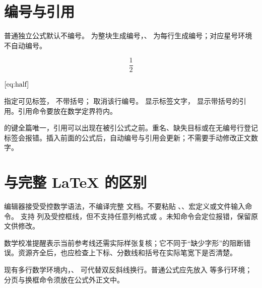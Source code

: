 \section{编号与引用}
普通独立公式默认不编号。 为整块生成编号，、 为每行生成编号；对应星号环境不自动编号。
\par\noindent\begin{minipage}{\linewidth}
\begin{Source}
$$
\begin{equation}
\frac{1}{2}\label{eq:half}
\end{equation}
$$

$\eqref{eq:half}$
\end{Source}
\end{minipage}\par\medskip
{} 指定可见标签， 不带括号；\code{\notag} 取消该行编号。\code{\ref} 显示标签文字，\code{\eqref} 显示带括号的引用。引用命令要放在数学定界符内。

\code{\label} 的键全篇唯一，引用可以出现在被引公式之前。重名、缺失目标或在无编号行登记标签会报错。插入前面的公式后，自动编号与引用会更新；不需要手动修改正文数字。

\section{与完整 LaTeX 的区别}
编辑器接受受控数学语法，不编译完整  文档。不要粘贴 \code{\documentclass}、\code{\usepackage}、宏定义或文件输入命令。 支持  列及受控框线，但不支持任意列格式或 \code{\multicolumn}。未知命令会定位报错，保留原文供修改。

数学校准提醒表示当前参考线还需实际样张复核；它不同于“缺少字形”的阻断错误。资源齐全后，也应检查上下标、分数线和括号在实际笔宽下是否清楚。


现有多行数学环境内，\code{\newline}、\code{\linebreak} 可代替双反斜线换行。普通公式应先放入  等多行环境；分页与换框命令须放在公式外正文中。

